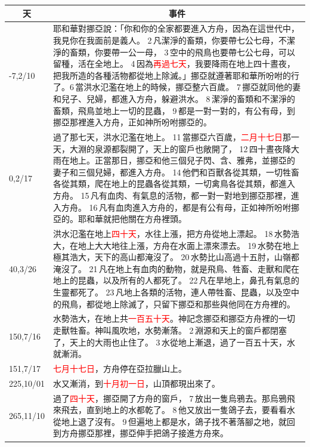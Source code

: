\begin{table}[H]
\centering
\begin{tabular}{p{1.75cm}|p{15.50cm}}\hline\hline
\multicolumn{1}{c|}{天}&\multicolumn{1}{c}{事件}\\\hline
-7,2/10&耶和華對挪亞說：「你和你的全家都要進入方舟，因為在這世代中，我見你在我面前是義人。 2 凡潔淨的畜類，你要帶七公七母，不潔淨的畜類，你要帶一公一母， 3 空中的飛鳥也要帶七公七母，可以留種，活在全地上。 4 因為\textcolor{red}{再過七天}，我要降雨在地上四十晝夜，把我所造的各種活物都從地上除滅。」挪亞就遵著耶和華所吩咐的行了。6 當洪水氾濫在地上的時候，挪亞整六百歲。 7 挪亞就同他的妻和兒子、兒婦，都進入方舟，躲避洪水。 8 潔淨的畜類和不潔淨的畜類，飛鳥並地上一切的昆蟲， 9 都是一對一對的，有公有母，到挪亞那裡進入方舟，正如神所吩咐挪亞的。\\\hline
0,2/17&過了那七天，洪水氾濫在地上。 11 當挪亞六百歲，\textcolor{red}{二月十七日}那一天，大淵的泉源都裂開了，天上的窗戶也敞開了， 12 四十晝夜降大雨在地上。正當那日，挪亞和他三個兒子閃、含、雅弗，並挪亞的妻子和三個兒婦，都進入方舟。 14 他們和百獸各從其類，一切牲畜各從其類，爬在地上的昆蟲各從其類，一切禽鳥各從其類，都進入方舟。 15 凡有血肉、有氣息的活物，都一對一對地到挪亞那裡，進入方舟。 16 凡有血肉進入方舟的，都是有公有母，正如神所吩咐挪亞的。耶和華就把他關在方舟裡頭。\\\hline
40,3/26&洪水氾濫在地上\textcolor{red}{四十天}，水往上漲，把方舟從地上漂起。 18 水勢浩大，在地上大大地往上漲，方舟在水面上漂來漂去。 19 水勢在地上極其浩大，天下的高山都淹沒了。 20 水勢比山高過十五肘，山嶺都淹沒了。 21 凡在地上有血肉的動物，就是飛鳥、牲畜、走獸和爬在地上的昆蟲，以及所有的人都死了。 22 凡在旱地上，鼻孔有氣息的生靈都死了。 23 凡地上各類的活物，連人帶牲畜、昆蟲，以及空中的飛鳥，都從地上除滅了，只留下挪亞和那些與他同在方舟裡的。\\\hline
150,7/16&水勢浩大，在地上共\textcolor{red}{一百五十天}。神記念挪亞和挪亞方舟裡的一切走獸牲畜。神叫風吹地，水勢漸落。 2 淵源和天上的窗戶都閉塞了，天上的大雨也止住了。 3 水從地上漸退，過了一百五十天，水就漸消。\\\hline
151,7/17&\textcolor{red}{七月十七日}，方舟停在亞拉臘山上。\\\hline
225,10/01&水又漸消，到\textcolor{red}{十月初一日}，山頂都現出來了。\\\hline
265,11/10&過了\textcolor{red}{四十天}，挪亞開了方舟的窗戶， 7 放出一隻烏鴉去。那烏鴉飛來飛去，直到地上的水都乾了。 8 他又放出一隻鴿子去，要看看水從地上退了沒有。 9 但遍地上都是水，鴿子找不著落腳之地，就回到方舟挪亞那裡，挪亞伸手把鴿子接進方舟來。\\\hline 

\end{tabular}
\end{table}
